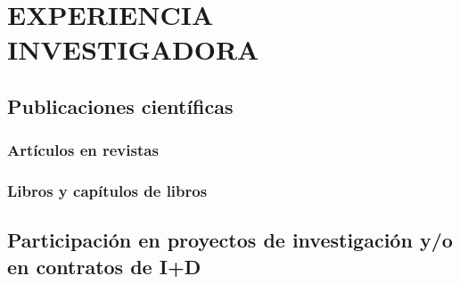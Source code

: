 \chapter{EXPERIENCIA INVESTIGADORA}
\section{Publicaciones científicas}
\subsection{Artículos en revistas}



\subsection{Libros y capítulos de libros}



\section{Participación en proyectos de investigación y/o en contratos de I+D}




